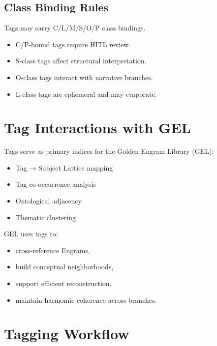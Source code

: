 \subsection{Class Binding Rules}

Tags may carry C/L/M/S/O/P class bindings.

\begin{itemize}
    \item C/P-bound tags require HITL review.
    \item S-class tags affect structural interpretation.
    \item O-class tags interact with narrative branches.
    \item L-class tags are ephemeral and may evaporate.
\end{itemize}

\section{Tag Interactions with GEL}

Tags serve as primary indices for the Golden Engram Library (GEL):

\begin{itemize}
    \item Tag → Subject Lattice mapping
    \item Tag co-occurrence analysis
    \item Ontological adjacency
    \item Thematic clustering
\end{itemize}

GEL uses tags to:
\begin{itemize}
    \item cross-reference Engrams,
    \item build conceptual neighborhoods,
    \item support efficient reconstruction,
    \item maintain harmomic coherence across branches.
\end{itemize}

\section{Tagging Workflow}

